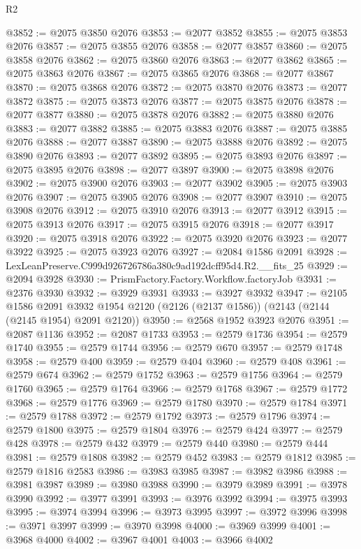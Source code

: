 \begin{lexlean}{R2}
\begin{coremodule}
@3852 := @2075 @3850 @2076
@3853 := @2077 @3852
@3855 := @2075 @3853 @2076
@3857 := @2075 @3855 @2076
@3858 := @2077 @3857
@3860 := @2075 @3858 @2076
@3862 := @2075 @3860 @2076
@3863 := @2077 @3862
@3865 := @2075 @3863 @2076
@3867 := @2075 @3865 @2076
@3868 := @2077 @3867
@3870 := @2075 @3868 @2076
@3872 := @2075 @3870 @2076
@3873 := @2077 @3872
@3875 := @2075 @3873 @2076
@3877 := @2075 @3875 @2076
@3878 := @2077 @3877
@3880 := @2075 @3878 @2076
@3882 := @2075 @3880 @2076
@3883 := @2077 @3882
@3885 := @2075 @3883 @2076
@3887 := @2075 @3885 @2076
@3888 := @2077 @3887
@3890 := @2075 @3888 @2076
@3892 := @2075 @3890 @2076
@3893 := @2077 @3892
@3895 := @2075 @3893 @2076
@3897 := @2075 @3895 @2076
@3898 := @2077 @3897
@3900 := @2075 @3898 @2076
@3902 := @2075 @3900 @2076
@3903 := @2077 @3902
@3905 := @2075 @3903 @2076
@3907 := @2075 @3905 @2076
@3908 := @2077 @3907
@3910 := @2075 @3908 @2076
@3912 := @2075 @3910 @2076
@3913 := @2077 @3912
@3915 := @2075 @3913 @2076
@3917 := @2075 @3915 @2076
@3918 := @2077 @3917
@3920 := @2075 @3918 @2076
@3922 := @2075 @3920 @2076
@3923 := @2077 @3922
@3925 := @2075 @3923 @2076
@3927 := @2084 @1586 @2091
@3928 := LexLeanPreserve.C999d926726786a380c9ad192dcff95d4.R2.__fits_25
@3929 := @2094 @3928
@3930 := PrismFactory.Factory.Workflow.factoryJob
@3931 := @2376 @3930
@3932 := @3929 @3931
@3933 := @3927 @3932
@3947 := @2105
    @1586
    @2091
    @3932
    @1954
    @2120
    (@2126 (@2137 @1586))
    (@2143 (@2144 (@2145 @1954) @2091 @2120))
@3950 := @2568 @1952 @3923 @2076
@3951 := @2087 @1136
@3952 := @2087 @1733
@3953 := @2579 @1736
@3954 := @2579 @1740
@3955 := @2579 @1744
@3956 := @2579 @670
@3957 := @2579 @1748
@3958 := @2579 @400
@3959 := @2579 @404
@3960 := @2579 @408
@3961 := @2579 @674
@3962 := @2579 @1752
@3963 := @2579 @1756
@3964 := @2579 @1760
@3965 := @2579 @1764
@3966 := @2579 @1768
@3967 := @2579 @1772
@3968 := @2579 @1776
@3969 := @2579 @1780
@3970 := @2579 @1784
@3971 := @2579 @1788
@3972 := @2579 @1792
@3973 := @2579 @1796
@3974 := @2579 @1800
@3975 := @2579 @1804
@3976 := @2579 @424
@3977 := @2579 @428
@3978 := @2579 @432
@3979 := @2579 @440
@3980 := @2579 @444
@3981 := @2579 @1808
@3982 := @2579 @452
@3983 := @2579 @1812
@3985 := @2579 @1816 @2583
@3986 := @3983 @3985
@3987 := @3982 @3986
@3988 := @3981 @3987
@3989 := @3980 @3988
@3990 := @3979 @3989
@3991 := @3978 @3990
@3992 := @3977 @3991
@3993 := @3976 @3992
@3994 := @3975 @3993
@3995 := @3974 @3994
@3996 := @3973 @3995
@3997 := @3972 @3996
@3998 := @3971 @3997
@3999 := @3970 @3998
@4000 := @3969 @3999
@4001 := @3968 @4000
@4002 := @3967 @4001
@4003 := @3966 @4002

\end{coremodule}
\end{lexlean}
